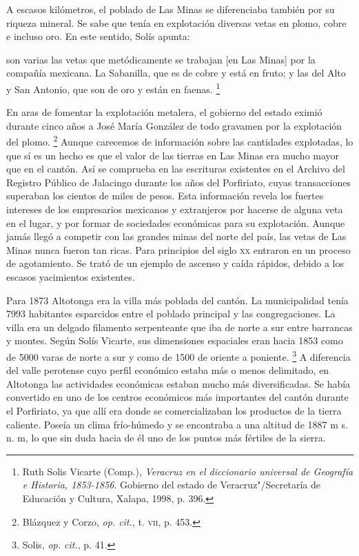 \documentclass[14pt,twoside,final]{extbook} %
\let\oldfootnote\footnote
\renewcommand\footnote[1]{%
\oldfootnote{\hspace{1mm}#1}}
\begin{document}
A escasos kilómetros, el poblado de Las Minas se diferenciaba también por su riqueza mineral. Se sabe que tenía en explotación diversas vetas en plomo, cobre e incluso oro. En este sentido, Solís apunta:
\begin{quoting}
son varias las vetas que metódicamente se trabajan [en Las Minas] por la compañía mexicana. La Sabanilla, que es de cobre y está en fruto; y las del Alto y San Antonio, que son de oro y están en faenas.\footnote{Ruth Solis Vicarte (Comp.), \emph{Veracruz en el diccionario universal de Geografía e Historia, 1853-1856}. Gobierno del estado de Veracruz"/Secretaría de Educación y Cultura, Xalapa, 1998, p. 396.}
\end{quoting}
En aras de fomentar la explotación metalera, el gobierno del estado eximió durante cinco años a José María González de todo gravamen por la explotación del plomo.\footnote{Blázquez y Corzo, \emph{op. cit.}, t. \textsc{vii}, p. 453.} Aunque carecemos de información sobre las cantidades explotadas, lo que sí es un hecho es que el valor de las tierras en Las Minas era mucho mayor que en el cantón. Así se comprueba en las escrituras existentes en el Archivo del Registro Público de Jalacingo durante los años del Porfiriato, cuyas transacciones superaban los cientos de miles de pesos. Esta información revela los fuertes intereses de los empresarios mexicanos y extranjeros por hacerse de alguna veta en el lugar, y por formar de sociedades económicas para su explotación. Aunque jamás llegó a competir con las grandes minas del norte del país, las vetas de Las Minas nunca fueron tan ricas. Para principios del siglo \textsc{xx} entraron en un proceso de agotamiento. Se trató de un ejemplo de ascenso y caída rápidos, debido a los escasos yacimientos existentes.

Para 1873 Altotonga era la villa más poblada del cantón. La municipalidad tenía 7993 habitantes esparcidos entre el poblado principal y las congregaciones. La villa era un delgado filamento serpenteante que iba de norte a sur entre barrancas y montes. Según Solís Vicarte, sus dimensiones espaciales eran hacia 1853 como de 5000 varas de norte a sur y como de 1500 de oriente a poniente.\footnote{Solis, \emph{op. cit.}, p. 41.} A diferencia del valle perotense cuyo perfil económico estaba más o menos delimitado, en Altotonga las actividades económicas estaban mucho más diversificadas. Se había convertido en uno de los centros económicos más importantes del cantón durante el Porfiriato, ya que allí era donde se comercializaban los productos de la tierra caliente. Poseía un clima frío-húmedo y se encontraba a una altitud de 1887 m s. n. m, lo que sin duda hacia de él uno de los puntos más fértiles de la sierra.
\end{document}
